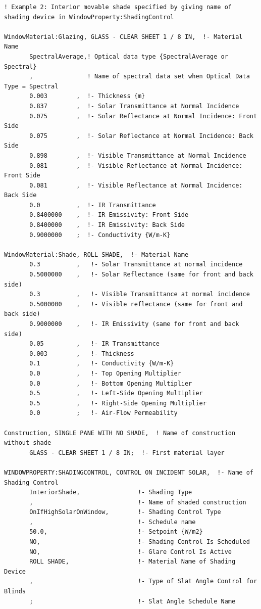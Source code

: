 \begin{lstlisting}
! Example 2: Interior movable shade specified by giving name of shading device in WindowProperty:ShadingControl

WindowMaterial:Glazing, GLASS - CLEAR SHEET 1 / 8 IN,  !- Material Name
       SpectralAverage,! Optical data type {SpectralAverage or Spectral}
       ,               ! Name of spectral data set when Optical Data Type = Spectral
       0.003        ,  !- Thickness {m}
       0.837        ,  !- Solar Transmittance at Normal Incidence
       0.075        ,  !- Solar Reflectance at Normal Incidence: Front Side
       0.075        ,  !- Solar Reflectance at Normal Incidence: Back Side
       0.898        ,  !- Visible Transmittance at Normal Incidence
       0.081        ,  !- Visible Reflectance at Normal Incidence: Front Side
       0.081        ,  !- Visible Reflectance at Normal Incidence: Back Side
       0.0          ,  !- IR Transmittance
       0.8400000    ,  !- IR Emissivity: Front Side
       0.8400000    ,  !- IR Emissivity: Back Side
       0.9000000    ;  !- Conductivity {W/m-K}

WindowMaterial:Shade, ROLL SHADE,  !- Material Name
       0.3          ,   !- Solar Transmittance at normal incidence
       0.5000000    ,   !- Solar Reflectance (same for front and back side)
       0.3          ,   !- Visible Transmittance at normal incidence
       0.5000000    ,   !- Visible reflectance (same for front and back side)
       0.9000000    ,   !- IR Emissivity (same for front and back side)
       0.05         ,   !- IR Transmittance
       0.003        ,   !- Thickness
       0.1          ,   !- Conductivity {W/m-K}
       0.0          ,   !- Top Opening Multiplier
       0.0          ,   !- Bottom Opening Multiplier
       0.5          ,   !- Left-Side Opening Multiplier
       0.5          ,   !- Right-Side Opening Multiplier
       0.0          ;   !- Air-Flow Permeability

Construction, SINGLE PANE WITH NO SHADE,  ! Name of construction without shade
       GLASS - CLEAR SHEET 1 / 8 IN;  !- First material layer

WINDOWPROPERTY:SHADINGCONTROL, CONTROL ON INCIDENT SOLAR,  !- Name of Shading Control
       InteriorShade,                !- Shading Type
       ,                             !- Name of shaded construction
       OnIfHighSolarOnWindow,        !- Shading Control Type
       ,                             !- Schedule name
       50.0,                         !- Setpoint {W/m2}
       NO,                           !- Shading Control Is Scheduled
       NO,                           !- Glare Control Is Active
       ROLL SHADE,                   !- Material Name of Shading Device
       ,                             !- Type of Slat Angle Control for Blinds
       ;                             !- Slat Angle Schedule Name


\end{lstlisting}
